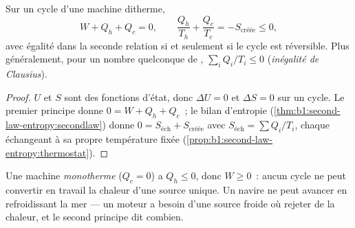 \begin{theorem}\label{thm:b1:heat-engines:clausius}
Sur un cycle d'une machine ditherme,
\[
W + Q_h + Q_c = 0 , \qquad
\frac{Q_h}{T_h} + \frac{Q_c}{T_c} = -S_{\text{créée}} \leq 0 ,
\]
avec égalité dans la seconde relation si et seulement si le cycle est
réversible. Plus généralement, pour un nombre quelconque de ,
$\sum_i Q_i/T_i \leq 0$ (\emph{inégalité de Clausius}).
\end{theorem}

\begin{proof}
$U$ et $S$ sont des fonctions d'état, donc $\Delta U = 0$ et $\Delta S = 0$ sur
un cycle. Le premier principe donne $0 = W + Q_h + Q_c$~; le bilan d'entropie
(\cref{thm:b1:second-law-entropy:secondlaw}) donne $0 = S_{\text{éch}} +
S_{\text{créée}}$ avec $S_{\text{éch}} = \sum Q_i/T_i$, chaque
 échangeant à sa propre température fixée
(\cref{prop:b1:second-law-entropy:thermostat}).
\end{proof}

\begin{corollary}\label{cor:b1:heat-engines:kelvin}
Une machine \emph{monotherme} ($Q_c = 0$) a $Q_h \leq 0$, donc $W \geq 0$~:
aucun cycle ne peut convertir en travail la chaleur d'une source unique. Un
navire ne peut avancer en refroidissant la mer --- un moteur a besoin d'une
source froide où rejeter de la chaleur, et le second principe dit combien.
\end{corollary}

